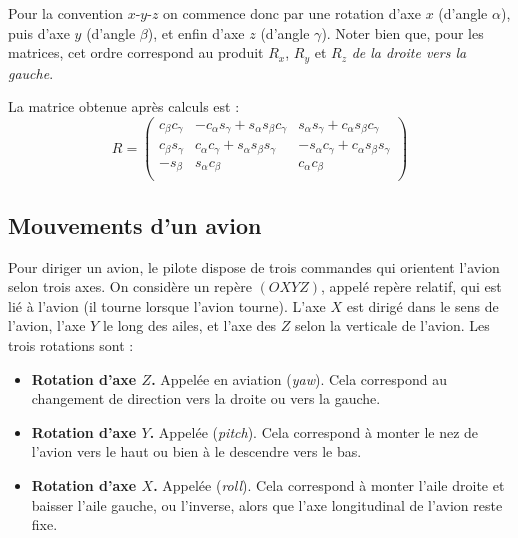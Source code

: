 \documentclass[11pt,class=report,crop=false]{standalone}
\begin{document}
Pour la convention  $x$-$y$-$z$ on commence donc par une rotation d'axe $x$ (d'angle $\alpha$), puis d'axe $y$ (d'angle $\beta$), et enfin d'axe $z$ (d'angle $\gamma$). Noter bien que, pour les matrices, cet ordre correspond au produit $R_x$, $R_y$ et  $R_z$ \emph{de la droite vers la gauche}.

La matrice obtenue après calculs est :
$$
R = \begin{pmatrix}
c_\beta c_\gamma & - c_\alpha s_\gamma + s_\alpha s_\beta c_\gamma &  s_\alpha s_\gamma + c_\alpha s_\beta c_\gamma \\
c_\beta s_\gamma & c_\alpha c_\gamma + s_\alpha s_\beta s_\gamma   &  - s_\alpha c_\gamma + c_\alpha s_\beta s_\gamma \\
- s_\beta        &  s_\alpha c_\beta                               &  c_\alpha c_\beta \\  
\end{pmatrix}
$$


\subsection{Mouvements d'un avion}

Pour diriger un avion, le pilote dispose de trois commandes qui orientent l'avion selon trois axes.
On considère un repère $(OXYZ)$, appelé repère relatif, qui est lié à l'avion (il tourne lorsque l'avion tourne). L'axe $X$ est dirigé dans le sens de l'avion, l'axe $Y$ le long des ailes, et l'axe des $Z$ selon la verticale de l'avion.
Les trois rotations sont :
\begin{itemize}
  \item \textbf{Rotation d'axe $Z$.} Appelée  en aviation (\emph{yaw}). Cela correspond au changement de direction vers la droite ou vers la gauche.

  \item \textbf{Rotation d'axe $Y$.} Appelée  (\emph{pitch}). Cela correspond à monter le nez de l'avion vers le haut ou bien à le descendre vers le bas.

  \item \textbf{Rotation d'axe $X$.} Appelée  (\emph{roll}). Cela correspond   
  à monter l'aile droite et baisser l'aile gauche, ou l'inverse, alors que l'axe longitudinal de l'avion reste fixe.
\end{itemize}
\end{document}
